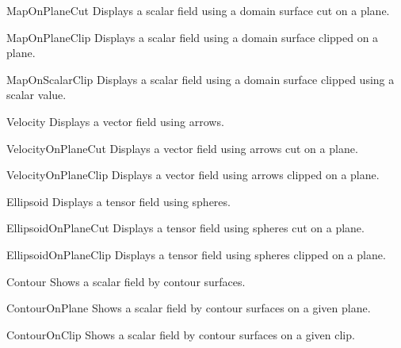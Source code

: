 \begin{classdesc}{MapOnPlaneCut}{}
 Displays a scalar field using a domain surface cut on a plane. 
\end{classdesc}

\begin{classdesc}{MapOnPlaneClip}{}
 Displays a scalar field using a domain surface clipped 
		on a plane.
\end{classdesc}

\begin{classdesc}{MapOnScalarClip}{}
 Displays a scalar field using a domain surface clipped 
		using a scalar value.
\end{classdesc}

\begin{classdesc}{Velocity}{}
 Displays a vector field using arrows.
\end{classdesc}

\begin{classdesc}{VelocityOnPlaneCut}{}
 Displays a vector field using arrows cut on a plane.
\end{classdesc}

\begin{classdesc}{VelocityOnPlaneClip}{}
 Displays a vector field using arrows clipped on a 
		plane.
\end{classdesc}

\begin{classdesc}{Ellipsoid}{}
 Displays a tensor field using spheres.
\end{classdesc}

\begin{classdesc}{EllipsoidOnPlaneCut}{}
 Displays a tensor field using spheres cut on a
        plane.
\end{classdesc}

\begin{classdesc}{EllipsoidOnPlaneClip}{}
 Displays a tensor field using spheres clipped 
        on a plane.
\end{classdesc}

        
\begin{classdesc}{Contour}{}
 Shows a scalar field by contour surfaces. 
\end{classdesc}

\begin{classdesc}{ContourOnPlane}{}
 Shows a scalar field by contour surfaces on 
a given plane.
\end{classdesc}

\begin{classdesc}{ContourOnClip}{}
 Shows a scalar field by contour surfaces on 
a given clip.
\end{classdesc}

